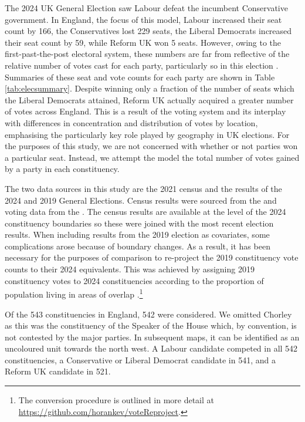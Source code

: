 \documentclass[webpdf,large,contemporary,namedate]{oup-authoring-template}
\theoremstyle{thmstyleone}
\theoremstyle{thmstyletwo}
\theoremstyle{thmstylethree}
\begin{document}
The 2024 UK General Election saw Labour defeat the incumbent
Conservative government. In England, the focus of this model, Labour
increased their seat count by 166, the Conservatives lost 229 seats, the
Liberal Democrats increased their seat count by 59, while Reform UK won
5 seats. However, owing to the first-past-the-post electoral system,
these numbers are far from reflective of the relative number of votes
cast for each party, particularly so in this election
\citep{Pattie2024}. Summaries of these seat and vote counts for each
party are shown in Table \ref{tab:elecsummary}. Despite winning only a
fraction of the number of seats which the Liberal Democrats attained,
Reform UK actually acquired a greater number of votes across England.
This is a result of the voting system and its interplay with differences
in concentration and distribution of votes by location, emphasising the
particularly key role played by geography in UK elections. For the
purposes of this study, we are not concerned with whether or not parties
won a particular seat. Instead, we attempt the model the total number of
votes gained by a party in each constituency.

The two data sources in this study are the 2021 census and the results
of the 2024 and 2019 General Elections. Census results were sourced from
the \citet{census2021} and voting data from the \citet{elections_data}.
The census results are available at the level of the 2024 constituency
boundaries so these were joined with the most recent election results.
When including results from the 2019 election as covariates, some
complications arose because of boundary changes. As a result, it has
been necessary for the purposes of comparison to re-project the 2019
constituency vote counts to their 2024 equivalents. This was achieved by
assigning 2019 constituency votes to 2024 constituencies according to
the proportion of population living in areas of overlap
\citep{boundary_changes}.\footnote{The conversion procedure is outlined
  in more detail at \url{https://github.com/horankev/voteReproject}.}

Of the 543 constituencies in England, 542 were considered. We omitted
Chorley as this was the constituency of the Speaker of the House which,
by convention, is not contested by the major parties. In subsequent
maps, it can be identified as an uncoloured unit towards the north west.
A Labour candidate competed in all 542 constituencies, a Conservative or
Liberal Democrat candidate in 541, and a Reform UK candidate in 521.
\end{document}
